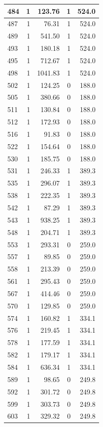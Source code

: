 \documentclass[
  spanish,
  12pt,
]{book}
\begin{document}
\begin{tabular}{l|r|r|r|r}
\hline
484 & 1 & 123.76 & 1 & 524.0\\
\hline
487 & 1 & 76.31 & 1 & 524.0\\
\hline
489 & 1 & 541.50 & 1 & 524.0\\
\hline
493 & 1 & 180.18 & 1 & 524.0\\
\hline
495 & 1 & 712.67 & 1 & 524.0\\
\hline
498 & 1 & 1041.83 & 1 & 524.0\\
\hline
502 & 1 & 124.25 & 0 & 188.0\\
\hline
505 & 1 & 380.66 & 0 & 188.0\\
\hline
511 & 1 & 130.84 & 0 & 188.0\\
\hline
512 & 1 & 172.93 & 0 & 188.0\\
\hline
516 & 1 & 91.83 & 0 & 188.0\\
\hline
522 & 1 & 154.64 & 0 & 188.0\\
\hline
530 & 1 & 185.75 & 0 & 188.0\\
\hline
531 & 1 & 246.33 & 1 & 389.3\\
\hline
535 & 1 & 296.07 & 1 & 389.3\\
\hline
538 & 1 & 222.35 & 1 & 389.3\\
\hline
542 & 1 & 87.29 & 1 & 389.3\\
\hline
543 & 1 & 938.25 & 1 & 389.3\\
\hline
548 & 1 & 204.71 & 1 & 389.3\\
\hline
553 & 1 & 293.31 & 0 & 259.0\\
\hline
557 & 1 & 89.85 & 0 & 259.0\\
\hline
558 & 1 & 213.39 & 0 & 259.0\\
\hline
561 & 1 & 295.43 & 0 & 259.0\\
\hline
567 & 1 & 414.46 & 0 & 259.0\\
\hline
570 & 1 & 129.85 & 0 & 259.0\\
\hline
574 & 1 & 160.82 & 1 & 334.1\\
\hline
576 & 1 & 219.45 & 1 & 334.1\\
\hline
578 & 1 & 177.59 & 1 & 334.1\\
\hline
582 & 1 & 179.17 & 1 & 334.1\\
\hline
584 & 1 & 636.34 & 1 & 334.1\\
\hline
589 & 1 & 98.65 & 0 & 249.8\\
\hline
592 & 1 & 301.72 & 0 & 249.8\\
\hline
599 & 1 & 303.73 & 0 & 249.8\\
\hline
603 & 1 & 329.32 & 0 & 249.8\\

\end{tabular}
\end{document}

